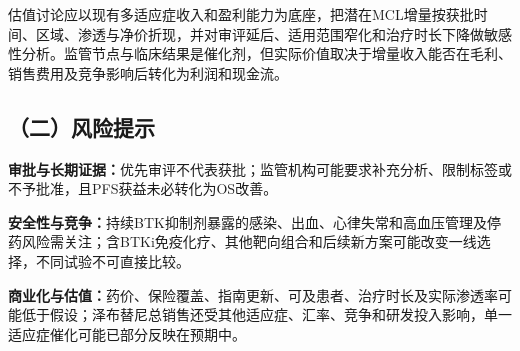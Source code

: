 \documentclass[a4paper,10pt,fontset=none]{ctexart}
\begin{document}
估值讨论应以现有多适应症收入和盈利能力为底座，把潜在MCL增量按获批时间、区域、渗透与净价折现，并对审评延后、适用范围窄化和治疗时长下降做敏感性分析。监管节点与临床结果是催化剂，但实际价值取决于增量收入能否在毛利、销售费用及竞争影响后转化为利润和现金流。

\subsection*{（二）风险提示}
\noindent\textbf{审批与长期证据：}优先审评不代表获批；监管机构可能要求补充分析、限制标签或不予批准，且PFS获益未必转化为OS改善。\par
\noindent\textbf{安全性与竞争：}持续BTK抑制剂暴露的感染、出血、心律失常和高血压管理及停药风险需关注；含BTKi免疫化疗、其他靶向组合和后续新方案可能改变一线选择，不同试验不可直接比较。\par
\noindent\textbf{商业化与估值：}药价、保险覆盖、指南更新、可及患者、治疗时长及实际渗透率可能低于假设；泽布替尼总销售还受其他适应症、汇率、竞争和研发投入影响，单一适应症催化可能已部分反映在预期中。
\clearpage
\end{document}
